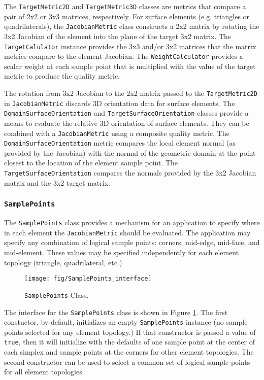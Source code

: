 \documentclass{article}
\begin{document}
The \texttt{TargetMetric2D} and \texttt{TargetMetric3D} classes are metrics that compare a pair of 2x2 or 3x3 matrices, respectively.  For surface elements (e.g. triangles or quadrilaterals), the \texttt{JacobianMetric} class constructs a 2x2 matrix by rotating the 3x2 Jacobian of the element into the plane of the target 3x2 matrix.  The \texttt{TargetCalulator} instance provides the 3x3 and/or 3x2 matrices that the matrix metrics compare to the element Jacobian.  The \texttt{WeightCalculator} provides a scalar weight at each sample point that is multiplied with the value of the target metric to produce the quality metric.

The rotation from 3x2 Jacobian to the 2x2 matrix passed to the \texttt{TargetMetric2D} in \texttt{JacobianMetric} discards 3D orientation data for surface elements.  The \texttt{DomainSurfaceOrientation} and \texttt{TargetSurfaceOrientation} classes provide a means to evaluate the relative 3D orientation of surface elements.  They can be combined with a \texttt{JacobianMetric} using a composite quality metric.  The \texttt{DomainSurfaceOrientation} metric compares the local element normal (as provided by the Jacobian) with the normal of the geometric domain at the point closest to the location of the element sample point.  The \texttt{TargetSurfaceOrientation} compares the normals provided by the 3x2 Jacobian matrix and the 3x2 target matrix.

\subsubsection{\texttt{SamplePoints}}
The \texttt{SamplePoints} class provides a mechanism for an application to specify where in each element the \texttt{JacobianMetric} should be evaluated.  The application may specify any combination of logical sample points: corners, mid-edge, mid-face, and mid-element.  These values may be specified independently for each element topology (triangle, quadrilateral, etc.)

\begin{figure}[htb]
\begin{center}
\texttt{[image: fig/SamplePoints\_interface]}
\caption{\texttt{SamplePoints} Class.\label{fig:SamplePoints}}
\end{center}
\end{figure}

The interface for the \texttt{SamplePoints} class is shown in Figure \ref{fig:SamplePoints}.  The first constuctor, by default, initializes an empty \texttt{SamplePoints} instance (no sample points selected for any element topology.)  If that constructor is passed a value of \texttt{true}, then it will initialize with the defaults of one sample point at the center of each simplex and sample points at the corners for other element topologies.  The second constructor can be used to select a common set of logical sample points for all element topologies.
\end{document}
